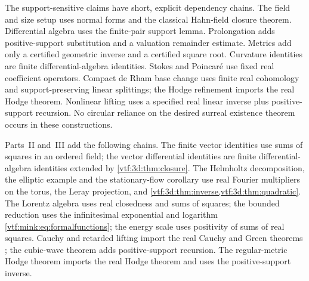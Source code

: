 \documentclass[11pt,letterpaper]{article}
\theoremstyle{definition}
\theoremstyle{remark}
\begin{document}
The support-sensitive claims have short, explicit dependency chains.
The field and size setup uses normal forms and the classical Hahn-field
closure theorem. Differential algebra uses the finite-pair support lemma.
Prolongation adds positive-support substitution and a valuation remainder
estimate. Metrics add only a certified geometric inverse and a certified
square root. Curvature identities are finite differential-algebra identities.
Stokes and Poincar\'e use fixed real coefficient operators. Compact de Rham
base change uses finite real cohomology and support-preserving linear
splittings; the Hodge refinement imports the real Hodge theorem. Nonlinear
lifting uses a specified real linear inverse plus positive-support recursion.
No circular reliance on the desired surreal existence theorem occurs in
these constructions.

Parts~II and~III add the following chains. The finite vector identities use sums
of squares in an ordered field; the vector differential identities are finite
differential-algebra identities extended by \cref{vtf:3d:thm:closure}. The
Helmholtz decomposition, the elliptic example and the stationary-flow corollary
use real Fourier multipliers on the torus, the Leray projection, and
\cref{vtf:3d:thm:inverse,vtf:3d:thm:quadratic}. The Lorentz algebra uses real
closedness and sums of squares; the bounded reduction uses the infinitesimal
exponential and logarithm \eqref{vtf:mink:eq:formalfunctions}; the energy scale
uses positivity of sums of real squares. Cauchy and retarded lifting import the
real Cauchy and Green theorems \cite{Bar,BGP}; the cubic-wave theorem adds
positive-support recursion. The regular-metric Hodge theorem imports the real
Hodge theorem and uses the positive-support inverse.
\end{document}

